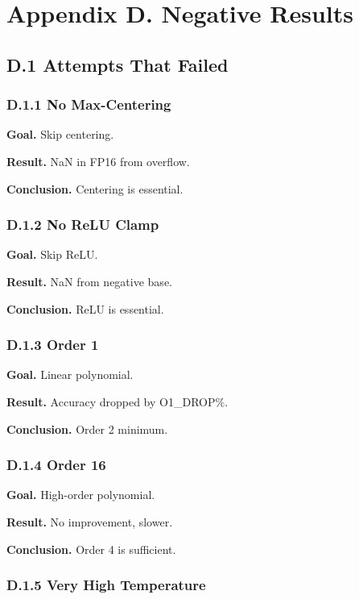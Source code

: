 \section{Appendix D. Negative Results}

\subsection{D.1 Attempts That Failed}

\subsubsection{D.1.1 No Max-Centering}

\textbf{Goal.} Skip centering.

\textbf{Result.} NaN in FP16 from overflow.

\textbf{Conclusion.} Centering is essential.

\subsubsection{D.1.2 No ReLU Clamp}

\textbf{Goal.} Skip ReLU.

\textbf{Result.} NaN from negative base.

\textbf{Conclusion.} ReLU is essential.

\subsubsection{D.1.3 Order 1}

\textbf{Goal.} Linear polynomial.

\textbf{Result.} Accuracy dropped by {{O1\_DROP}}\%.

\textbf{Conclusion.} Order 2 minimum.

\subsubsection{D.1.4 Order 16}

\textbf{Goal.} High-order polynomial.

\textbf{Result.} No improvement, slower.

\textbf{Conclusion.} Order 4 is sufficient.

\subsubsection{D.1.5 Very High Temperature}


